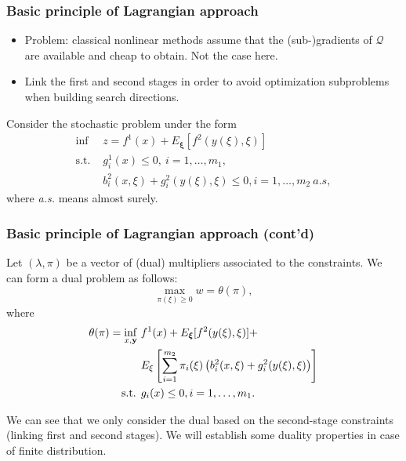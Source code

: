 \documentclass[french]{beamer}
\def\bxi{\boldsymbol\xi}
\begin{document}
\begin{frame}
\frametitle{Basic principle of Lagrangian approach}

\begin{itemize}
\item
Problem: classical nonlinear methods assume that the (sub-)gradients of $\mathcal{Q}$ are available and cheap to obtain.
Not the case here.
\item
Link the first and second stages in order to avoid optimization subproblems when building search directions.
\end{itemize}

\mbox{}

Consider the stochastic problem under the form
\begin{align*}
\inf\ & z = f^1(x) + E_{\bxi}[f^2(y(\xi),\xi)]\\
\text{s.t. }& g_i^1(x) \leq 0,\ i=1,\ldots{},m_1,\\
& b_i^2(x,\xi)+g_i^2(y(\xi),\xi) \leq 0, i=1,\ldots{},m_2\ a.s,
\end{align*}
where \textit{a.s.} means almost surely.

\end{frame}

\begin{frame}
\frametitle{Basic principle of Lagrangian approach (cont'd)}

Let $(\lambda, \pi)$ be a vector of (dual) multipliers associated to the constraints.
We can form a dual problem as follows:
\[
\max_{\pi(\xi) \geq 0} w = \theta(\pi),
\]
where
\begin{align*}
\theta(\pi) = \inf_{x, {\bf y}}\ & f^1(x)+E_{\bxi} [f^2(y(\xi),\xi)] + \\
& E_{\xi}\left[\sum_{i=1}^{m_2} \pi_i(\xi) \left( b_i^2(x,\xi) +
  g_i^2(y(\xi), \xi) \right) \right] \\
\text{s.t. } & g_i(x) \leq 0, i=1,\ldots{},m_1.
\end{align*}

We can see that we only consider the dual based on the second-stage constraints (linking first and second stages).
We will establish some duality properties in case of finite distribution.

\end{frame}
\end{document}
